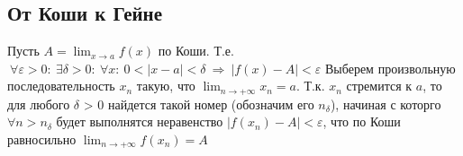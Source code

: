 \subsection{От Коши к Гейне}
Пусть $\displaystyle A = \lim_{x \to a} f(x)$ по Коши. Т.е.\newline
$\displaystyle\ \forall \varepsilon > 0 : \ \exists \delta > 0: \ \forall x : \ 0 < |x - a| < \delta \ \Rightarrow \ |f(x) - A| < \varepsilon $\newline
Выберем произвольную последовательность  $x_n$  такую, что  $\displaystyle \lim_{n \to +\infty} x_n = a$. Т.к. $x_n$ стремится к $a$, то для любого $\delta$ > 0 найдется такой номер (обозначим его $n_\delta$), начиная с которго $\forall n>n_\delta$ будет выполнятся неравенство $|f(x_n) - A|<\varepsilon$, что по Коши равносильно $\displaystyle \lim_{n \to +\infty} f(x_n) = A$
